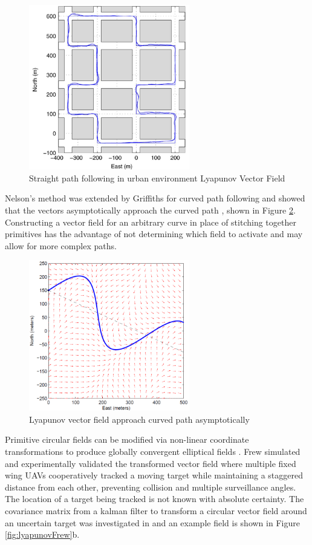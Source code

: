 \documentclass[numbered,pdftex]{ohio-etd}
\begin{document}
\begin{figure}[H]
	\centering
	\includegraphics[width=7cm]{PaperFigures/urbanFollowingNelson}
	\caption{Straight path following in urban environment \cite{nelson_cooperative_2005 using} Lyapunov Vector Field}
	\label{fig:urbanfollowingnelson}
\end{figure}


Nelson's method was extended by Griffiths for curved path following and showed that the vectors asymptotically approach the curved path \cite{griffiths_vector_2006}, shown in Figure \ref{fig:griffiths}. Constructing a vector field for an arbitrary curve in place of stitching together primitives has the advantage of not determining which field to activate and may allow for more complex paths.

\begin{figure}[H]
	\centering
	\includegraphics[width=7cm]{PaperFigures/griffiths}
	\caption{Lyapunov vector field approach curved path asymptotically \cite{griffiths_vector_2006}}
	\label{fig:griffiths}
\end{figure}


Primitive circular fields can be modified via non-linear coordinate transformations to produce globally convergent elliptical fields \cite{frew_lyapunov_nodate,frew_cooperative_2007}. Frew simulated and experimentally validated the transformed vector field where multiple fixed wing UAVs cooperatively tracked a moving target while maintaining a staggered distance from each other, preventing collision and multiple surveillance angles. The location of a target being tracked is not known with absolute certainty. The covariance matrix from a kalman filter to transform a circular vector field around an uncertain target was investigated in \cite{frew_cooperative_2007} and an example field is shown in Figure \ref{fig:lyapunovFrew}b.
\end{document}
